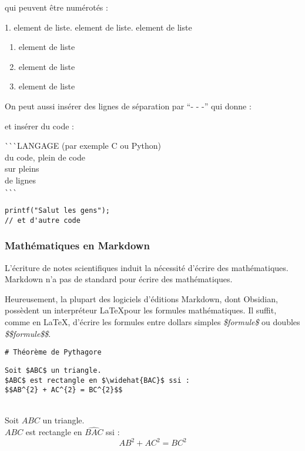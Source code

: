 \documentclass[../../../main.tex]{subfiles}
\begin{document}
qui peuvent être numérotés :

\begin{minipage}{0.5\textwidth}
1. element de liste. element de liste. element de liste
\end{minipage}
\begin{minipage}{0.5\textwidth}
\begin{enumerate}
	\item element de liste
	\item element de liste
	\item element de liste
\end{enumerate}
\end{minipage}

On peut aussi insérer des lignes de séparation par ``- - -'' qui donne :

\hrulefill

et insérer du code :

\begin{minipage}{0.5\textwidth}
\`{}\`{}\`{}LANGAGE (par exemple C ou Python) \\
du code, plein de code \\
sur pleins \\
de lignes \\
\`{}\`{}\`{}
\end{minipage}
\begin{minipage}{0.5\textwidth}
\begin{verbatim}
printf("Salut les gens");
// et d'autre code
\end{verbatim}
\end{minipage}

\subsubsection{Mathématiques en Markdown}
L'écriture de notes scientifiques induit la nécessité d'écrire des mathématiques. Markdown n'a pas de standard pour écrire des mathématiques.

Heureusement, la plupart des logiciels d'éditions Markdown, dont Obsidian, possèdent un interpréteur \LaTeX pour les formules mathématiques. Il suffit, comme en \LaTeX, d'écrire les formules entre dollars simples \textit{\$formule\$} ou doubles \textit{\$\$formule\$\$}.

\begin{minipage}{0.5\textwidth}
\small
\texttt{\# Théorème de Pythagore} \\

\begin{verbatim}
Soit $ABC$ un triangle.
$ABC$ est rectangle en $\widehat{BAC}$ ssi :
$$AB^{2} + AC^{2} = BC^{2}$$
\end{verbatim}
\end{minipage}
\begin{minipage}{0.5\textwidth}
 \\

Soit $ABC$ un triangle. \\
$ABC$ est rectangle en $\widehat{BAC}$ ssi :
$$AB^{2} + AC^{2} = BC^{2}$$
\end{minipage}
\end{document}

